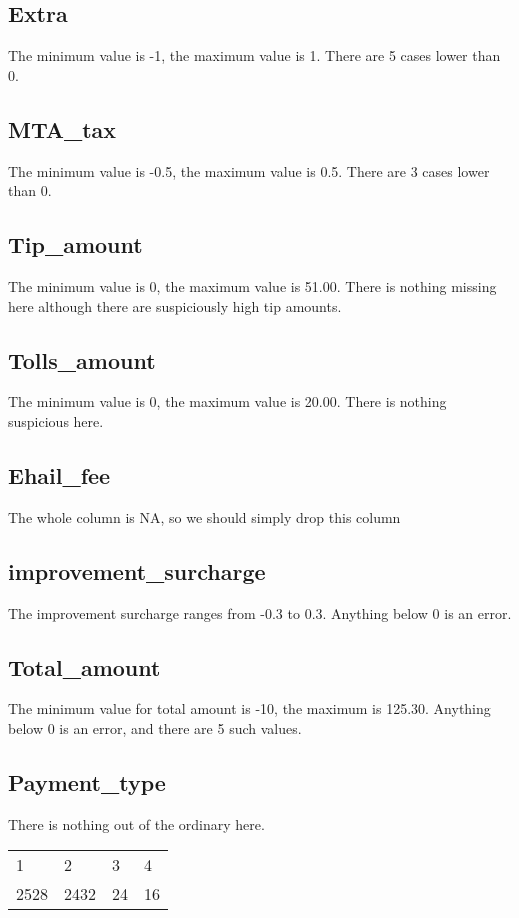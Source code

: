 \documentclass{article}
\begin{document}
\subsection{Extra}
The minimum value is -1, the maximum value is 1. There are 5 cases lower than 0.

\subsection{MTA\_tax}
The minimum value is -0.5, the maximum value is 0.5. There are 3 cases lower than 0.

\subsection{Tip\_amount}
The minimum value is 0, the maximum value is 51.00. There is nothing missing here although there are suspiciously high tip amounts.

\subsection{Tolls\_amount}
The minimum value is 0, the maximum value is 20.00. There is nothing suspicious here.

\subsection{Ehail\_fee}
The whole column is NA, so we should simply drop this column

\subsection{improvement\_surcharge}
The improvement surcharge ranges from -0.3 to 0.3. Anything below 0 is an error.

\subsection{Total\_amount}
The minimum value for total amount is -10, the maximum is 125.30. Anything below 0 is an error, and there are 5 such values.

\subsection{Payment\_type}
There is nothing out of the ordinary here.
\begin{table}[H]
\centering
\begin{tabular}{llll}
1    & 2  & 3 & 4   \\
2528 & 2432 & 24 & 16
\end{tabular}
\end{table}
\end{document}
